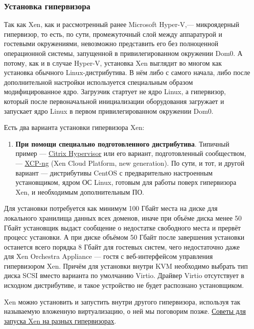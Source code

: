 \documentclass[14pt, a4paper]{article}
\begin{document}
\subsubsection*{Установка гипервизора}


Так как Xen, как и рассмотренный ранее Microsoft Hyper-V,— микроядерный гипервизор, то есть, по
сути, промежуточный слой между аппаратурой и гостевыми окружениями, невозможно представить
его без полноценной операционной системы, запущенной в привилегированном окружении Dom0. А
потому, как и в случае Hyper-V, установка Xen выглядит во многом как установка обычного
Linux-дистрибутива. В нём либо с самого начала, либо после дополнительной настройки используется
специальным образом модифицированное ядро. Загрузчик стартует не ядро Linux, а гипервизор,
который после первоначальной инициализации оборудования загружает и запускает ядро Linux в
первом привилегированном окружении Dom0.


Есть два варианта установки гипервизора Xen:

\begin{enumerate}
    \item \textbf{При помощи специально подготовленного дистрибутива}. Типичный пример — \href{https://www.citrix.com/products/citrix-hypervisor/}{Citrix
    Hypervisor} или его вариант, подготовленный сообществом, — \href{https://xcp-ng.org/}{XCP-ng} (Xen Cloud Platform, new
    generation). По сути, и тот, и другой вариант — дистрибутивы CentOS с предварительно
    настроенным установщиком, ядром ОС Linux, готовым для работы поверх гипервизора Xen, и
    необходимым дополнительным ПО.
\end{enumerate}


Для установки потребуется как минимум 100 Гбайт места на диске для локального хранилища данных
всех доменов, иначе при объёме диска менее 50 Гбайт установщик выдаст сообщение о недостатке
свободного места и прервёт процесс установки. А при диске объёмом 50 Гбайт после завершения
установки останется всего порядка 8 Гбайт для гостевых систем, чего недостаточно даже для Xen
Orchestra Appliance — гостя с веб-интерфейсом управления гипервизором Xen. Причём для установки
внутри KVM необходимо выбрать тип диска SCSI вместо варианта по умолчанию Virtio. Драйвер Virtio
отсутствует в исходном дистрибутиве, и такое устройство не будет распознано установщиком.


Xen можно установить и запустить внутри другого гипервизора, используя так называемую вложенную
виртуализацию, о ней мы поговорим позже. \href{https://github.com/xcp-ng/xcp/wiki/Testing-XCP-ng-in-Virtual-Machine-(Nested-Virtualization)#nested-xcp-ng-using-qemukvm}{Советы для запуска Xen на разных гипервизорах}.
\end{document}

